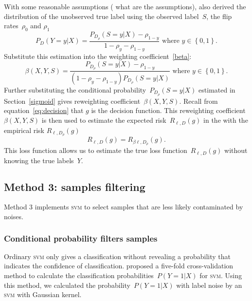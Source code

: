 \documentclass[12pt]{article} %
\newcommand{\loss}{\ell}
\begin{document}
With some reasonable assumptions ({\color{red} what are the assumptions}), \citet{liu2016classification} also derived the distribution of the unobserved  true label using the observed label~$S$, the flip rates~$\rho_{0}$ and $\rho_{1}$
\begin{equation}
    P_D(Y=y|X)=\frac{P_{D_\rho}(S=y|X)-\rho_{1-y}}{1-\rho_{y}-\rho_{1-y}}\text{ where }y\in \left\{0,1\right\}.
\end{equation}
Substitute this estimation into the weighting coefficient~\eqref{beta}:
\begin{equation}
    \beta(X,Y,S)=\frac{P_{D_\rho}(S=y|X)-\rho_{1-y}}{(1-\rho_{y}-\rho_{1-y})P_{D_\rho}(S=y|X)}\text{ where }y\in \left\{0,1\right\}.
\end{equation}
Further substituting the conditional probability~$P_{D_\rho}(S=y|X)$ estimated in Section~\ref{sigmoid} gives reweighting coefficient~$\beta(X,Y,S)$. 
Recall from equation~\eqref{eq:decision} that  $g$ is the decision function. 
This reweighting coefficient~$\beta(X,Y,S)$ is then used to estimate the expected risk~$R_{\loss,D}(g)$ in the with the empirical risk $R_{\loss,D_\rho}(g)$
\begin{equation}
R_{\loss,D}(g) = R_{\beta \loss,D_\rho}(g). \label{eq:loss}
\end{equation}
This loss function allows us to estimate the true loss function~$R_{\loss,D}(g)$ without knowing the true labels~$Y$. 

\subsection{Method 3: samples filtering}\label{2nd}
Method 3 implements \textsc{svm} to select samples that are less likely contaminated by noises. 

\subsubsection{Conditional probability filters samples}\label{2nd2}
Ordinary \textsc{svm} only gives a classification without revealing a probability that indicates the confidence of classification. 
\citet{Wu03probabilityestimates} proposed a five-fold cross-validation method to calculate the classification probabilities~$P(Y=1|X)$ for \textsc{svm}. 
Using this method, we calculated the probability~$P(Y=1|X)$ with label noise by an \textsc{svm} with Gaussian kernel. 
\end{document}
